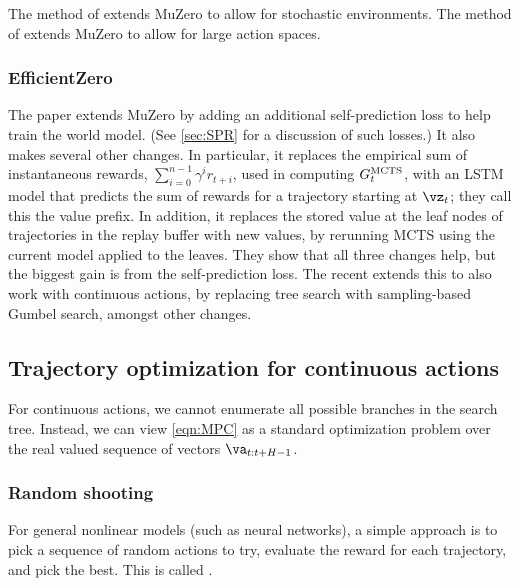 The   method
of \citep{Antonoglou2022} extends MuZero to allow for stochastic
environments.
The  method of \citep{Hubert2021}
extends MuZero to allow for large action spaces.



\subsubsection{EfficientZero}
\label{sec:efficientZero}


The 
paper  \citep{efficientZero} extends MuZero by adding
an additional  self-prediction loss to help train the world model.
(See \cref{sec:SPR} for a discussion of such losses.)
It also makes several other changes.
In particular, it replaces the empirical sum of instantaneous rewards,
$\sum_{i=0}^{n-1} \gamma^i r_{t+i}$,
used in computing $G_t^{\text{MCTS}}$,
with an LSTM model that predicts the sum of rewards
for a trajectory starting at $\vz_t$;
they call this the value prefix.
In addition, 
it replaces the stored value at the leaf nodes
of trajectories in the replay buffer with new values,
by rerunning MCTS using the current model
applied to  the leaves.
They show that all three changes help,
but the biggest gain is from the self-prediction  loss.
The recent 
\citep{efficientZeroV2} extends this to also work with continuous
actions,
by replacing tree search with sampling-based Gumbel search,
amongst other changes.



\subsection{Trajectory optimization for continuous actions}



For continuous actions, we cannot enumerate
all possible branches in the search tree.
Instead, we can view \cref{eqn:MPC}
as a standard optimization problem over
the real valued sequence of vectors $\va_{t:t+H-1}$.

\subsubsection{Random shooting}

For general nonlinear models (such as neural networks),
a simple approach
is to pick a sequence of random actions to try,
evaluate the reward for each trajectory,
and pick the best.
This is called 
\citep{Diehl2007,Rao2010}.

